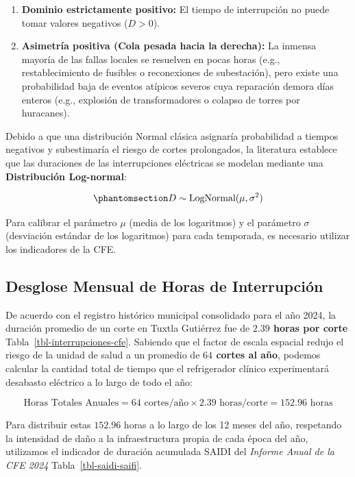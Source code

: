 \documentclass[
  spanish,
  letterpaper,
  DIV=11,
  numbers=noendperiod]{scrreprt}
\providecommand{\tightlist}{%
  \setlength{\itemsep}{0pt}\setlength{\parskip}{0pt}}
\theoremstyle{plain}
\theoremstyle{plain}
\theoremstyle{plain}
\theoremstyle{definition}
\theoremstyle{remark}
\begin{document}
\begin{enumerate}
\def\labelenumi{\arabic{enumi}.}
\tightlist
\item
  \textbf{Dominio estrictamente positivo:} El tiempo de interrupción no
  puede tomar valores negativos (\(D > 0\)).
\item
  \textbf{Asimetría positiva (Cola pesada hacia la derecha):} La inmensa
  mayoría de las fallas locales se resuelven en pocas horas (e.g.,
  restablecimiento de fusibles o reconexiones de subestación), pero
  existe una probabilidad baja de eventos atípicos severos cuya
  reparación demora días enteros (e.g., explosión de transformadores o
  colapso de torres por huracanes).
\end{enumerate}

Debido a que una distribución Normal clásica asignaría probabilidad a
tiempos negativos y subestimaría el riesgo de cortes prolongados, la
literatura establece que las duraciones de las interrupciones eléctricas
se modelan mediante una \textbf{Distribución Log-normal}:

\begin{equation}\phantomsection\label{eq-lognormal-def}{
D \sim \text{LogNormal}(\mu, \sigma^2)
}\end{equation}

Para calibrar el parámetro \(\mu\) (media de los logaritmos) y el
parámetro \(\sigma\) (desviación estándar de los logaritmos) para cada
temporada, es necesario utilizar los indicadores de la CFE.

\subsection{Desglose Mensual de Horas de
Interrupción}\label{desglose-mensual-de-horas-de-interrupciuxf3n}

De acuerdo con el registro histórico municipal consolidado para el año
2024, la duración promedio de un corte en Tuxtla Gutiérrez fue de
\textbf{\(2.39\) horas por corte} Tabla~\ref{tbl-interrupciones-cfe}.
Sabiendo que el factor de escala espacial redujo el riesgo de la unidad
de salud a un promedio de \textbf{\(64\) cortes al año}, podemos
calcular la cantidad total de tiempo que el refrigerador clínico
experimentará desabasto eléctrico a lo largo de todo el año:

\[
\text{Horas Totales Anuales} = 64 \text{ cortes/año} \times 2.39 \text{ horas/corte} = 152.96 \text{ horas}
\]

Para distribuir estas \(152.96\) horas a lo largo de los 12 meses del
año, respetando la intensidad de daño a la infraestructura propia de
cada época del año, utilizamos el indicador de duración acumulada SAIDI
del \emph{Informe Anual de la CFE 2024} Tabla~\ref{tbl-saidi-saifi}.
\end{document}
